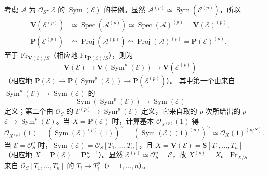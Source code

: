 考虑 $\mathcal A$ 为 $\mathcal O_S$- $\mathcal E$ 的 $\operatorname{Sym}(\mathcal E)$ 的特例。显然 $\mathcal A^{(p)}\simeq\operatorname{Sym}(\mathcal E^{(p)})$，所以
\[
\begin{aligned}
\mathbf V(\mathcal E^{(p)})&\simeq\operatorname{Spec}(\mathcal A^{(p)})\simeq\operatorname{Spec}(\mathcal A)^{(p)}=\mathbf V(\mathcal E)^{(p)},\\
\mathbf P(\mathcal E^{(p)})&\simeq\operatorname{Proj}(\mathcal A^{(p)})\simeq\operatorname{Proj}(\mathcal A)^{(p)}=\mathbf P(\mathcal E)^{(p)}.
\end{aligned}
\]
至于 $\mathrm{Fr}_{\mathbf V(\mathcal E)/S}$（相应地 $\mathrm{Fr}_{\mathbf P(\mathcal E)/S}$），则为
\[
\mathbf V(\mathcal E)\longrightarrow\mathbf V(\operatorname{Sym}^p(\mathcal E))\longrightarrow\mathbf V(\mathcal E^{(p)})
\]
（相应地 $\mathbf P(\mathcal E)\to\mathbf P(\operatorname{Sym}^p(\mathcal E))\to\mathbf P(\mathcal E^{(p)})$）。
其中第一个由来自 $\operatorname{Sym}^p(\mathcal E)\to\operatorname{Sym}(\mathcal E)$ 的
\[
\operatorname{Sym}(\operatorname{Sym}^p(\mathcal E))\longrightarrow\operatorname{Sym}(\mathcal E)
\]
定义；第二个由 $\mathcal O_S$-的 $\mathcal E^{(p)}\to\operatorname{Sym}^p(\mathcal E)$ 定义，它来自取的 $p$ 次所给出的 $p$- $\mathcal E\to\operatorname{Sym}^p(\mathcal E)$。当 $X=\mathbf P(\mathcal E)$ 时，计算基本 $\mathcal O_{X^{(p)}}(1)$ 得
\[
\mathcal O_{X^{(p)}}(1)
=(\operatorname{Sym}(\mathcal E)^{(p)}(1))^{\sim}
=(\operatorname{Sym}(\mathcal E)(1)^{(p)})^{\sim}
\simeq\mathcal O_X(1)^{(p/S)}.
\]
当 $\mathcal E=\mathcal O_S^n$ 时，$\operatorname{Sym}(\mathcal E)=\mathcal O_S[T_1,\ldots,T_n]$，且 $X=\mathbf V(\mathcal E)=\mathbf S[T_1,\ldots,T_n]$（相应地 $X=\mathbf P(\mathcal E)=\mathbf P_S^{n-1}$）。显然 $\mathcal E^{(p)}\simeq\mathcal O_S^n=\mathcal E$，故 $X^{(p)}=X$。 $\mathrm{Fr}_{X/S}$ 来自 $\mathcal O_S[T_1,\ldots,T_n]$ 的 $T_i\mapsto T_i^p$（$i=1,\ldots,n$）。

